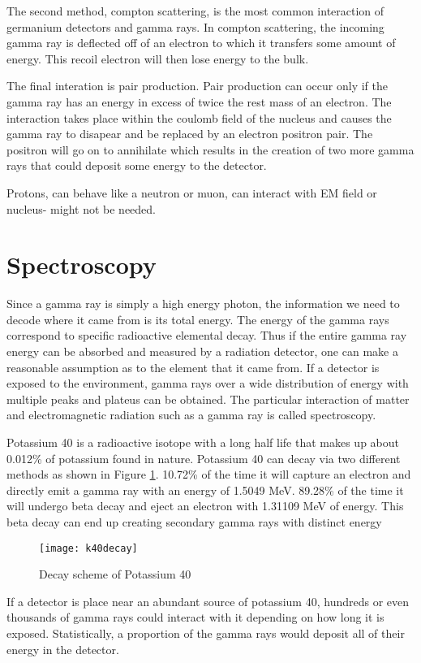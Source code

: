 The second method, compton scattering, is the most common interaction of germanium detectors and gamma rays.
In compton scattering, the incoming gamma ray is deflected off of an electron to which it transfers some amount of energy.
This recoil electron will then lose energy to the bulk.

The final interation is pair production.
Pair production can occur only if the gamma ray has an energy in excess of twice the rest mass of an electron.
The interaction takes place within the coulomb field of the nucleus and causes the gamma ray to disapear and be replaced by an electron positron pair.
The positron will go on to annihilate which results in the creation of two more gamma rays that could deposit some energy to the detector.

Protons, can behave like a neutron or muon, can interact with EM field or nucleus- might not be needed.

\section{Spectroscopy}
Since a gamma ray is simply a high energy photon, the information we need to decode where it came from is its total energy.
The energy of the gamma rays correspond to specific radioactive elemental decay.
Thus if the entire gamma ray energy can be absorbed and measured by a radiation detector, one can make a reasonable assumption as to the element that it came from.
If a detector is exposed to the environment, gamma rays over a wide distribution of energy with multiple peaks and plateus can be obtained.
The particular interaction of matter and electromagnetic radiation such as a gamma ray is called spectroscopy.

Potassium 40 is a radioactive isotope with a long half life that makes up about 0.012\% of potassium found in nature.
Potassium 40 can decay via two different methods as shown in Figure \ref{fig:k40decay}.
10.72\% of the time it will capture an electron and directly emit a gamma ray with an energy of 1.5049 MeV.
89.28\% of the time it will undergo beta decay and eject an electron with 1.31109 MeV of energy.
This beta decay can end up creating secondary gamma rays with distinct energy 
\begin{figure}[htpb]
\centering
\texttt{[image: k40decay]}
\caption{Decay scheme of Potassium 40}
\label{fig:k40decay}
\end{figure}
If a detector is place near an abundant source of potassium 40, hundreds or even thousands of gamma rays could interact with it depending on how long it is exposed.
Statistically, a proportion of the gamma rays would deposit all of their energy in the detector.


